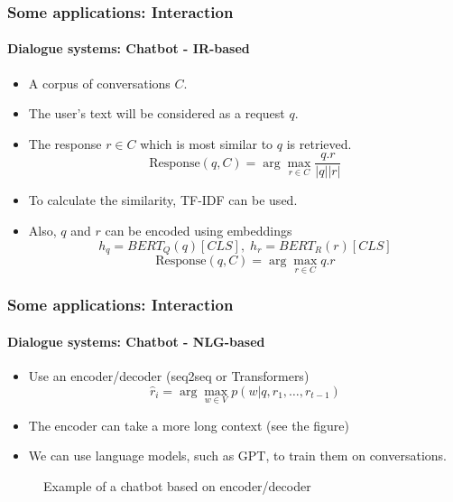 \documentclass[xcolor=table]{beamer}
\begin{document}
\begin{frame}
	\frametitle{Some applications: Interaction}
	\framesubtitle{Dialogue systems: Chatbot - IR-based}
	
	\begin{itemize}
		\item A corpus of conversations $C$.
		\item The user's text will be considered as a request $q$.
		\item The response $r \in C$ which is most similar to $q$ is retrieved.
		\[\text{Response}(q, C) = \arg\max_{r \in C} \frac{q . r}{|q| |r|}\]
		\item To calculate the similarity, TF-IDF can be used.
		\item Also, $q$ and $r$ can be encoded using embeddings
		\[h_q = BERT_Q(q)[CLS],\; h_r = BERT_R(r)[CLS]\]
		\[\text{Response}(q, C) = \arg\max_{r \in C} q . r\]
	\end{itemize}
\end{frame}

\begin{frame}
	\frametitle{Some applications: Interaction}
	\framesubtitle{Dialogue systems: Chatbot - NLG-based}
	
	\begin{itemize}
		\item Use an encoder/decoder (seq2seq or Transformers)
		\[ \hat{r}_i = \arg\max_{w \in V} p(w| q, r_1, \ldots, r_{t-1}) \]
		
		\item The encoder can take a more long context (see the figure)
		
		\item We can use language models, such as GPT, to train them on conversations.
	\end{itemize}
	
	\begin{figure}
		\centering
		\caption{Example of a chatbot based on encoder/decoder \cite{2020-jurafsky-martin}}
	\end{figure}
	
\end{frame}
\end{document}
